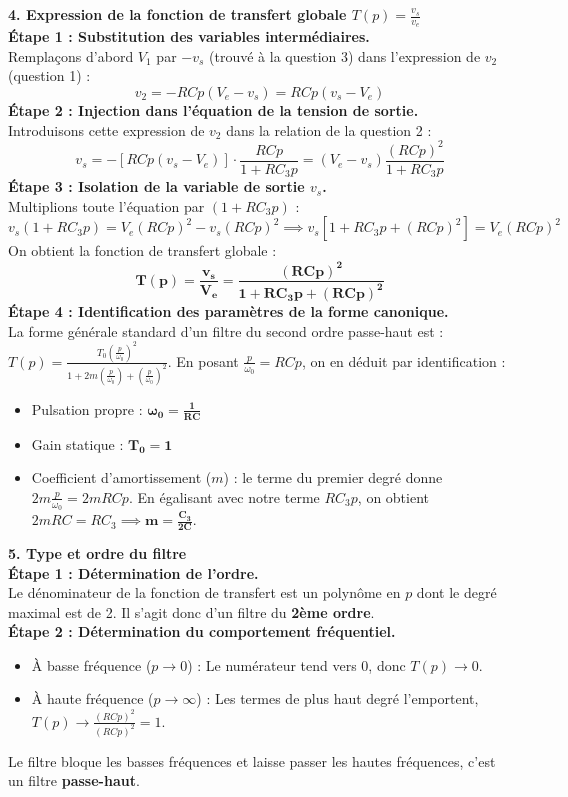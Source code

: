 \documentclass[11pt, a4paper]{article}
\begin{document}
\begin{minipage}{\textwidth}
{\vspace{0.2cm}
\textbf{4. Expression de la fonction de transfert globale $T(p) = \frac{v_s}{v_e}$}\\
\textbf{Étape 1 : Substitution des variables intermédiaires.}\\
Remplaçons d'abord $V_1$ par $-v_s$ (trouvé à la question 3) dans l'expression de $v_2$ (question 1) :
$$ v_2 = -RCp(V_e - v_s) = RCp(v_s - V_e) $$
\textbf{Étape 2 : Injection dans l'équation de la tension de sortie.}\\
Introduisons cette expression de $v_2$ dans la relation de la question 2 :
$$ v_s = - \left[ RCp(v_s - V_e) \right] \cdot \frac{RCp}{1 + RC_3p} = (V_e - v_s) \frac{(RCp)^2}{1 + RC_3p} $$
\textbf{Étape 3 : Isolation de la variable de sortie $v_s$.}\\
Multiplions toute l'équation par $(1 + RC_3p)$ :
$$ v_s(1 + RC_3p) = V_e(RCp)^2 - v_s(RCp)^2 \implies v_s \left[1 + RC_3p + (RCp)^2\right] = V_e(RCp)^2 $$
On obtient la fonction de transfert globale :
$$ \mathbf{T(p) = \frac{v_s}{V_e} = \frac{(RCp)^2}{1 + RC_3p + (RCp)^2}} $$
\textbf{Étape 4 : Identification des paramètres de la forme canonique.}\\
La forme générale standard d'un filtre du second ordre passe-haut est : $T(p) = \frac{T_0 \left(\frac{p}{\omega_0}\right)^2}{1 + 2m\left(\frac{p}{\omega_0}\right) + \left(\frac{p}{\omega_0}\right)^2}$. En posant $\frac{p}{\omega_0} = RCp$, on en déduit par identification :
\begin{itemize}
    \item Pulsation propre : $\mathbf{\omega_0 = \frac{1}{RC}}$
    \item Gain statique : $\mathbf{T_0 = 1}$
    \item Coefficient d'amortissement ($m$) : le terme du premier degré donne $2m\frac{p}{\omega_0} = 2mRCp$. En égalisant avec notre terme $RC_3p$, on obtient $2mRC = RC_3 \implies \mathbf{m = \frac{C_3}{2C}}$.
\end{itemize}

\vspace{0.2cm}
\textbf{5. Type et ordre du filtre}\\
\textbf{Étape 1 : Détermination de l'ordre.}\\
Le dénominateur de la fonction de transfert est un polynôme en $p$ dont le degré maximal est de 2. Il s'agit donc d'un filtre du \textbf{2ème ordre}.\\
\textbf{Étape 2 : Détermination du comportement fréquentiel.}\\
\begin{itemize}
    \item À basse fréquence ($p \to 0$) : Le numérateur tend vers 0, donc $T(p) \to 0$.
    \item À haute fréquence ($p \to \infty$) : Les termes de plus haut degré l'emportent, $T(p) \to \frac{(RCp)^2}{(RCp)^2} = 1$.
\end{itemize}
Le filtre bloque les basses fréquences et laisse passer les hautes fréquences, c'est un filtre \textbf{passe-haut}.

}
\end{minipage}
\end{document}
